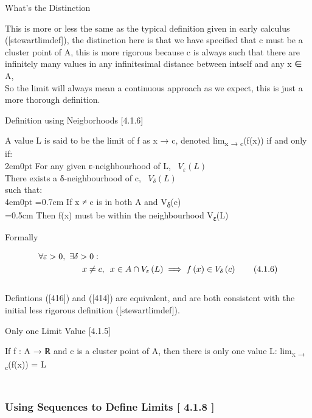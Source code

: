 What's the Distinction

This is more or less the same as the typical definition given in early
calculus ({[}stewartlimdef{]}), the distinction here is that we have
specified that {c} must be a cluster point of {A}, this is more rigorous
because c is always such that there are infinitely many values in any
infinitesimal distance between intself and any {x} ∈ {A},\\
So the limit will always mean a continuous approach as we expect, this
is just a more thorough definition.

Definition using Neigborhoods
{[}4.1.6{]}\protect\hypertarget{definition-using-neigborhoods-4.1.6}{}{}

A value {L} is said to be the limit of {f} as {x} → {c}, denoted
lim\textsubscript{{x} → {c}}({f}({x})) if and only if:\\

2em0pt {For any} given {ε}-neighbourhood of {L},
\(\enspace V_{\varepsilon}(L)\)\\
{There exists} a {δ}-neighbourhood of {c},
\(\enspace V_{\delta}\left( L \right)\)\\

such that:~\\

4em0pt =0.7cm {If} {x} ≠ {c} is in both {A} and
{V}\textsubscript{{δ}}({c})\\
=0.5cm {Then} {f}({x}) must be within the neighbourhood
{V}\textsubscript{{ε}}({L})

Formally

\[\begin{aligned} \forall
\varepsilon > 0, & \enspace
\exists \delta > 0:
\notag \\ &
\qquad x \neq c, \enspace x
\in A\cap
V_{\varepsilon}\left( L
\right) \implies f\left( x
\right) \in
V_{\delta}\left( c
\right) \tag{4.1.6}
\label{416}\end{aligned}\]\\

Defintions ({[}416{]}) and ({[}414{]}) are equivalent, and are both
consistent with the initial less rigorous definition
({[}stewartlimdef{]}).

Only one Limit Value
{[}4.1.5{]}\protect\hypertarget{only-one-limit-value-4.1.5}{}{}

If {f} : {A} → ℝ and {c} is a cluster point of {A}, then there is only
one value L: lim\textsubscript{{x} → {c}}({f}({x})) = {L}

\hypertarget{using-sequences-to-define-limits-4.1.8}{%
\subsubsection[\hfill\break
Using Sequences to Define Limits {[} 4.1.8
{]}]{\texorpdfstring{\protect\hypertarget{SECTION00011300000000000000}{}{}\protect\hypertarget{using-sequences-to-define-limits-4.1.8}{}{}~\\
Using Sequences to Define Limits {[} 4.1.8
{]}}{ Using Sequences to Define Limits {[} 4.1.8 {]}}}\label{using-sequences-to-define-limits-4.1.8}}

